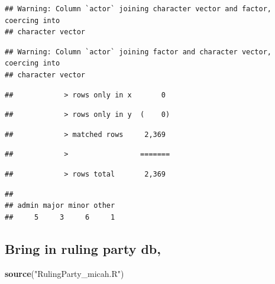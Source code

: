 \documentclass[
]{article}
\newenvironment{Shaded}{\begin{snugshade}}{\end{snugshade}}
\newcommand{\KeywordTok}[1]{\textcolor[rgb]{0.13,0.29,0.53}{\textbf{#1}}}
\newcommand{\NormalTok}[1]{#1}
\newcommand{\OperatorTok}[1]{\textcolor[rgb]{0.81,0.36,0.00}{\textbf{#1}}}
\newcommand{\StringTok}[1]{\textcolor[rgb]{0.31,0.60,0.02}{#1}}
\begin{document}
\begin{verbatim}
## Warning: Column `actor` joining character vector and factor, coercing into
## character vector
\end{verbatim}

\begin{verbatim}
## Warning: Column `actor` joining factor and character vector, coercing into
## character vector
\end{verbatim}

\begin{verbatim}
##            > rows only in x       0
\end{verbatim}

\begin{verbatim}
##            > rows only in y  (    0)
\end{verbatim}

\begin{verbatim}
##            > matched rows     2,369
\end{verbatim}

\begin{verbatim}
##            >                 =======
\end{verbatim}

\begin{verbatim}
##            > rows total       2,369
\end{verbatim}

\begin{Shaded}
\end{Shaded}

\begin{verbatim}
## 
## admin major minor other 
##     5     3     6     1
\end{verbatim}

\hypertarget{bring-in-ruling-party-db}{%
\subsection{Bring in ruling party db,}\label{bring-in-ruling-party-db}}

\begin{Shaded}
\begin{Highlighting}[]
\KeywordTok{source}\NormalTok{(}\StringTok{"RulingParty_micah.R"}\NormalTok{)}
\end{Highlighting}
\end{Shaded}
\end{document}
